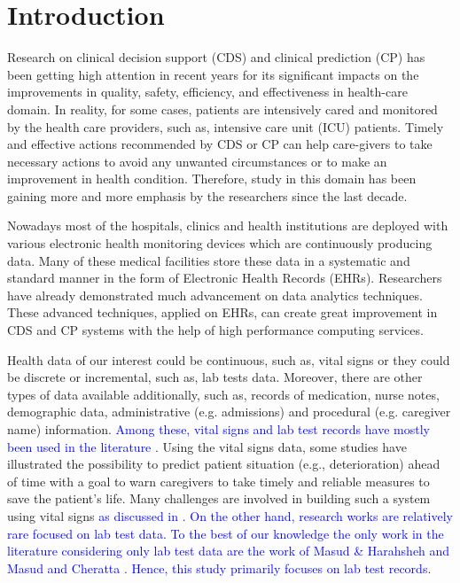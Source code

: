 \section{Introduction}
Research on clinical decision support (CDS) and clinical prediction (CP) has been getting high attention in recent years for its significant impacts on the improvements in quality, safety, efficiency, and effectiveness in health-care domain. In reality, for some cases, patients are intensively cared and monitored by the health care providers, such as, intensive care unit (ICU) patients. Timely and effective actions recommended by CDS or CP can help care-givers to take necessary actions to avoid any unwanted circumstances or to make an improvement in health condition. Therefore, study in this domain has been gaining more and more emphasis by the researchers since the last decade.

Nowadays most of the hospitals, clinics and health institutions are deployed with various electronic health monitoring devices which are continuously producing data. Many of these medical facilities store these data in  a systematic and standard manner in the form of Electronic Health Records (EHRs). Researchers have already demonstrated much advancement on data analytics techniques. These advanced techniques, applied on EHRs, can create great improvement in CDS and CP systems with the help of high performance computing services.

Health data of our interest could be continuous, such as, vital signs or they could be discrete or incremental, such as, lab tests data. Moreover, there are other types of data available additionally, such as, records of medication, nurse notes, demographic data, administrative (e.g. admissions) and procedural (e.g. caregiver name) information. \textcolor{blue}{Among these, vital signs and lab test records have mostly been used in the literature \cite{Mao,Fialho,Baumgartner,Cheng, Ghassemi2015, Jin2018, Yoon2016, Johnson2017, Calvert2016, Suresh2017, Bhattacharya2017, Xie2017, Awad2017, Nguyen2017, Zhang2017, Johnson2nd2017, Davoodi2018, Sadeghi2018, Zheng2018, Johnson3rd2018, Zahid2018, Purushotham2018, Meyer2018, Hsieh2018, Ho2019, Gennatas2019, Torres2019}}. Using the vital signs data, some studies have illustrated the possibility to predict patient situation (e.g., deterioration) ahead of time with a goal to warn caregivers to take timely and reliable measures to save the patient’s life. Many challenges are involved in building such a system using vital signs \textcolor{blue}{as discussed in \cite{Mao,Fialho,Baumgartner,Cheng, ZhengpingChe2016, Zahid2018, Zheng2018, Xiao2018}. On the other hand, research works are relatively rare focused on lab test data. To the best of our knowledge the only work in the literature considering only lab test data are the work of  Masud \& Harahsheh \cite{mehedy-masud:2017:fvc} and Masud and Cheratta \cite{mehedy-masud:2018:frmwrk}. Hence, this study primarily focuses on lab test records}.

